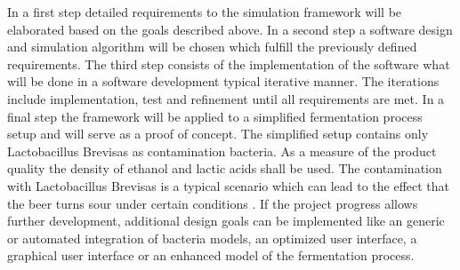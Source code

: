 In a first step detailed requirements to the simulation framework will be elaborated based on the goals described above. In a second step
a software design and simulation algorithm will be chosen which fulfill the previously defined requirements. The third step consists of the
implementation of the software what will be done in a software development typical iterative manner. The iterations include implementation,
test and refinement until all requirements are met. In a final step the framework will be applied to a simplified fermentation process setup
and will serve as a proof of concept. The simplified setup contains only Lactobacillus Brevisas as contamination bacteria. As a measure of
the product quality the density of ethanol and lactic acids shall be used. The contamination with Lactobacillus Brevisas is a typical
scenario which can lead to the effect that the beer turns sour under certain conditions \cite{JIB:JIB49}.
If the project progress allows further development, additional design goals can be implemented like an generic or automated integration of
bacteria models, an optimized user interface, a graphical user interface or an enhanced model of the fermentation process.

